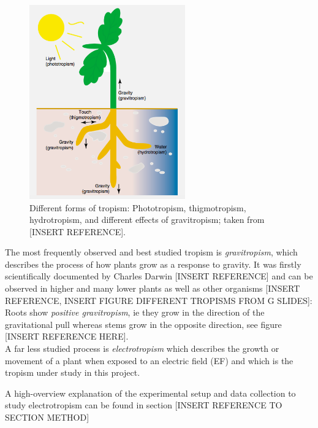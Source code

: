 \begin{figure}[H]
	\centering
	\includegraphics[width=0.6\textwidth]{../Figures/tropism.png}
	\caption{Different forms of tropism: Phototropism, thigmotropism, hydrotropism, and different effects of gravitropism; taken from [INSERT REFERENCE].}
	\label{fig:tropism}
\end{figure}

The most frequently observed and best studied tropism is \textit{gravitropism}, which describes the process of how plants grow as a response to gravity. It was firstly scientifically documented by Charles Darwin [INSERT REFERENCE] and can be observed in higher and many lower plants as well as other organisms [INSERT REFERENCE, INSERT FIGURE DIFFERENT TROPISMS FROM G SLIDES]: Roots show \textit{positive gravitropism}, ie they grow in the direction of the gravitational pull whereas stems grow in the opposite direction, see figure [INSERT REFERENCE HERE]. 
\\
A far less studied process is \textit{electrotropism} which describes the growth or movement of a plant when exposed to an electric field (EF) and which is the tropism under study in this project. 

A high-overview explanation of the experimental setup and data collection to study electrotropism can be found in section [INSERT REFERENCE TO SECTION METHOD]

